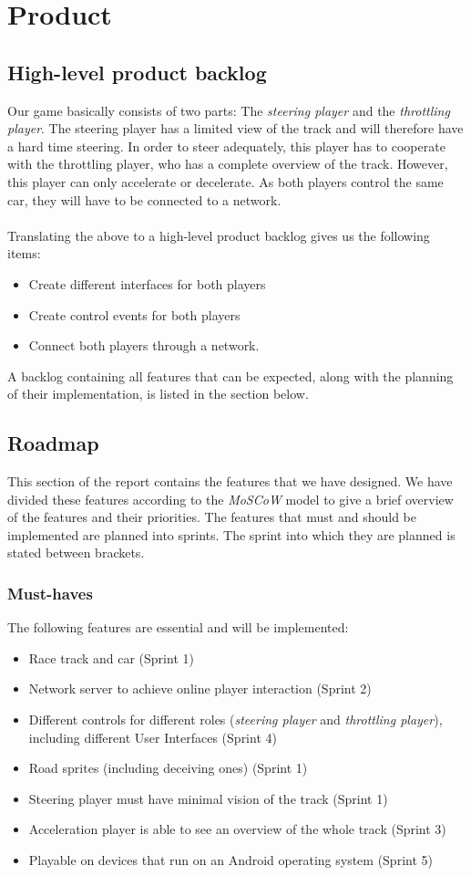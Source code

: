 \documentclass[11pt,twoside,a4paper]{article}
\begin{document}
\section{Product}
\subsection{High-level product backlog}
Our game basically consists of two parts: The \emph{steering player} and the \emph{throttling player}. The steering player has a limited view of the track and will therefore have a hard time steering. In order to steer adequately, this player has to cooperate with the throttling player, who has a complete overview of the track. However, this player can only accelerate or decelerate. As both players control the same car, they will have to be connected to a network. \\\\
Translating the above to a high-level product backlog gives us the following items:
\begin{itemize}
	\item Create different interfaces for both players
	\item Create control events for both players
	\item Connect both players through a network.
\end{itemize}
A backlog containing all features that can be expected, along with the planning of their implementation, is listed in the section below.

\newpage

\subsection{Roadmap}
This section of the report contains the features that we have designed. We have divided these features according to the \emph{MoSCoW} model to give a brief overview of the features and their priorities. The features that must and should be implemented are planned into sprints. The sprint into which they are planned is stated between brackets.
\subsubsection{Must-haves}
The following features are essential and will be implemented:
\begin{itemize}
	\item Race track and car (Sprint 1)
	\item Network server to achieve online player interaction (Sprint 2)
	\item Different controls for different roles (\emph{steering player} and \emph{throttling player}), including different User Interfaces (Sprint 4)
	\item Road sprites (including deceiving ones) (Sprint 1)
    \item Steering player must have minimal vision of the track (Sprint 1)
    \item Acceleration player is able to see an overview of the whole track (Sprint 3)
    \item Playable on devices that run on an Android operating system (Sprint 5)
\end{itemize}
\end{document}
